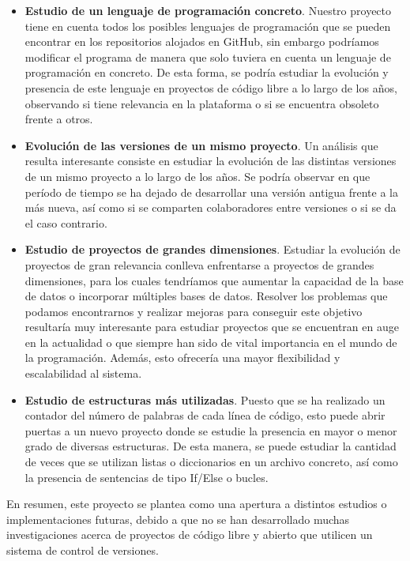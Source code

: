 \documentclass[a4paper, 12pt]{book}
\begin{document}
\begin{itemize}
  \item \textbf{Estudio de un lenguaje de programación concreto}. Nuestro proyecto tiene en cuenta todos los posibles lenguajes de programación que se pueden encontrar en los repositorios alojados
  en GitHub, sin embargo podríamos modificar el programa de manera que solo tuviera en cuenta un lenguaje de programación en concreto. De esta forma, se podría estudiar la evolución y presencia de 
  este lenguaje en proyectos de código libre a lo largo de los años, observando si tiene relevancia en la plataforma o si se encuentra obsoleto frente a otros.
  \item \textbf{Evolución de las versiones de un mismo proyecto}. Un análisis que resulta interesante consiste en estudiar la evolución de las distintas versiones de un mismo proyecto a lo largo de los años.
  Se podría observar en que período de tiempo se ha dejado de desarrollar una versión antigua frente a la más nueva, así como si se comparten colaboradores entre versiones o si se da el caso contrario.
  \item \textbf{Estudio de proyectos de grandes dimensiones}. Estudiar la evolución de proyectos de gran relevancia conlleva enfrentarse a proyectos de grandes dimensiones, para los cuales tendríamos
  que aumentar la capacidad de la base de datos o incorporar múltiples bases de datos. Resolver los problemas que podamos encontrarnos y realizar mejoras para conseguir este objetivo resultaría muy
  interesante para estudiar proyectos que se encuentran en auge en la actualidad o que siempre han sido de vital importancia en el mundo de la programación. Además, esto ofrecería una mayor flexibilidad
  y escalabilidad al sistema.
  \item \textbf{Estudio de estructuras más utilizadas}. Puesto que se ha realizado un contador del número de palabras de cada línea de código, esto puede abrir puertas a un nuevo proyecto donde se estudie la
  presencia en mayor o menor grado de diversas estructuras. De esta manera, se puede estudiar la cantidad de veces que se utilizan listas o diccionarios en un archivo concreto, así como la presencia de
  sentencias de tipo If/Else o bucles. 
\end{itemize}

En resumen, este proyecto se plantea como una apertura a distintos estudios o implementaciones futuras, debido a que no se han desarrollado muchas investigaciones acerca de proyectos de código libre 
y abierto que utilicen un sistema de control de versiones.
\end{document}
